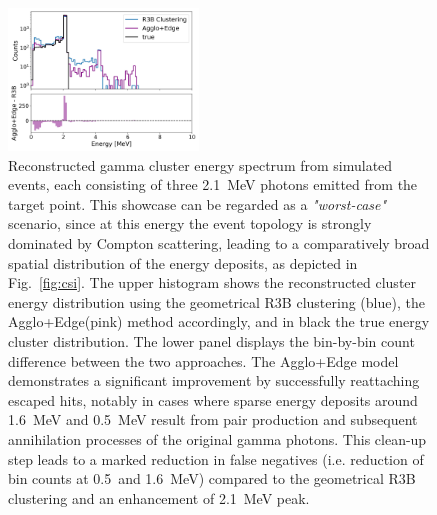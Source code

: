 \documentclass[review,sort&compress]{elsarticle}
\begin{document}
\begin{figure}[!htb]
        \centering
        \includegraphics[width=0.45\textwidth]{fig2.png}
		\caption{
		Reconstructed gamma  cluster energy spectrum from simulated events, each consisting of three 2.1~MeV photons emitted from the target point. This showcase can be regarded as a \textit{"worst-case"} scenario, since at this energy the event topology is strongly dominated by Compton scattering, leading to a comparatively broad spatial distribution of the energy deposits, as depicted in Fig.~\ref{fig:csi}. The upper histogram shows the reconstructed cluster energy distribution using the geometrical R3B clustering (blue), the Agglo+Edge(pink) method accordingly, and in black the true energy cluster distribution. The lower panel displays the bin-by-bin count difference between the two approaches. The Agglo+Edge model demonstrates a significant improvement by successfully reattaching escaped hits, notably in cases where sparse energy deposits around 1.6~MeV and 0.5~MeV result from pair production and subsequent annihilation processes of the original gamma photons. This clean-up step leads to a marked reduction in false negatives (i.e. reduction of bin counts at 0.5~and 1.6~MeV) compared to the geometrical R3B clustering and an enhancement of 2.1~MeV peak.
			}
        \label{fig:2_1_mev_r3b_aggloNN}%
\end{figure}
\end{document}
